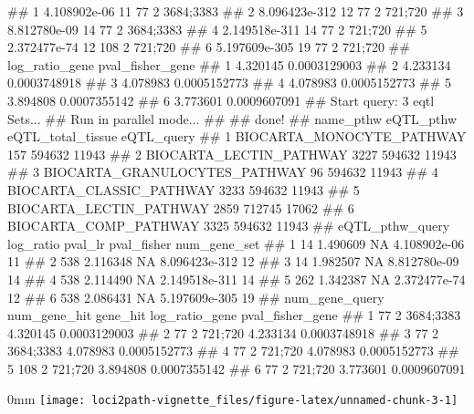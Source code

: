\documentclass[]{article}
\renewenvironment{verbatim}{\color{codecolor}\begin{myshaded}\begin{oldverbatim}}{\end{oldverbatim}\end{myshaded}}
\theoremstyle{definition}
\theoremstyle{definition}
\theoremstyle{remark}
\begin{document}
\begin{verbatim}
## 1  4.108902e-06           11             77            2 3684;3383
## 2 8.096423e-312           12             77            2   721;720
## 3  8.812780e-09           14             77            2 3684;3383
## 4 2.149518e-311           14             77            2   721;720
## 5  2.372477e-74           12            108            2   721;720
## 6 5.197609e-305           19             77            2   721;720
##   log_ratio_gene pval_fisher_gene
## 1       4.320145     0.0003129003
## 2       4.233134     0.0003748918
## 3       4.078983     0.0005152773
## 4       4.078983     0.0005152773
## 5       3.894808     0.0007355142
## 6       3.773601     0.0009607091
## Start query: 3 eqtl Sets...
## Run in parallel mode...
## 
## done!
##                       name_pthw eQTL_pthw eQTL_total_tissue eQTL_query
## 1     BIOCARTA_MONOCYTE_PATHWAY       157            594632      11943
## 2       BIOCARTA_LECTIN_PATHWAY      3227            594632      11943
## 3 BIOCARTA_GRANULOCYTES_PATHWAY        96            594632      11943
## 4      BIOCARTA_CLASSIC_PATHWAY      3233            594632      11943
## 5       BIOCARTA_LECTIN_PATHWAY      2859            712745      17062
## 6         BIOCARTA_COMP_PATHWAY      3325            594632      11943
##   eQTL_pthw_query log_ratio pval_lr   pval_fisher num_gene_set
## 1              14  1.490609      NA  4.108902e-06           11
## 2             538  2.116348      NA 8.096423e-312           12
## 3              14  1.982507      NA  8.812780e-09           14
## 4             538  2.114490      NA 2.149518e-311           14
## 5             262  1.342387      NA  2.372477e-74           12
## 6             538  2.086431      NA 5.197609e-305           19
##   num_gene_query num_gene_hit  gene_hit log_ratio_gene pval_fisher_gene
## 1             77            2 3684;3383       4.320145     0.0003129003
## 2             77            2   721;720       4.233134     0.0003748918
## 3             77            2 3684;3383       4.078983     0.0005152773
## 4             77            2   721;720       4.078983     0.0005152773
## 5            108            2   721;720       3.894808     0.0007355142
## 6             77            2   721;720       3.773601     0.0009607091
\end{verbatim}

\begin{adjustwidth}{\fltoffset}{0mm}
\texttt{[image: loci2path-vignette\_files/figure-latex/unnamed-chunk-3-1]} \end{adjustwidth}
\end{document}
